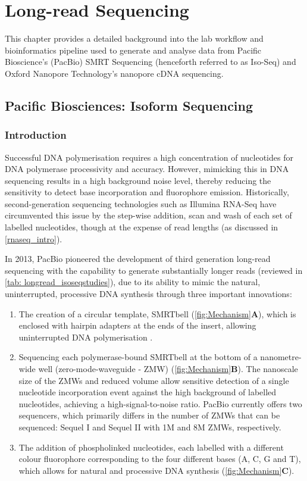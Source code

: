\chapter{Long-read Sequencing}\label{ch: long_read_sequencing}

This chapter provides a detailed background into the lab workflow and bioinformatics pipeline used to generate and analyse data from Pacific Bioscience's (PacBio) SMRT Sequencing (henceforth referred to as Iso-Seq) and Oxford Nanopore Technology's nanopore cDNA sequencing. 

\section{Pacific Biosciences: Isoform Sequencing}
\label{sec:pb_isoform_sequencing}

\subsection{Introduction}
Successful DNA polymerisation requires a high concentration of nucleotides for DNA polymerase processivity and accuracy. However, mimicking this in DNA sequencing results in a high background noise level, thereby reducing the sensitivity to detect base incorporation and fluorophore emission. Historically, second-generation sequencing technologies such as Illumina RNA-Seq have circumvented this issue by the step-wise addition, scan and wash of each set of labelled nucleotides, though at the expense of read lengths (as discussed in \cref{rnaseq_intro}). 

In 2013, PacBio pioneered the development of third generation long-read sequencing with the capability to generate substantially longer reads (reviewed in \cref{tab: longread_isoseqstudies}), due to its ability to mimic the natural, uninterrupted, processive DNA synthesis through three important innovations\cite{Eid2009}: 
\begin{enumerate}
	\item The creation of a circular template, SMRTbell (\cref{fig:Mechanism}\textbf{A}), which is enclosed with hairpin adapters at the ends of the insert, allowing uninterrupted DNA polymerisation \cite{Travers2010}.
	\item Sequencing each polymerase-bound SMRTbell at the bottom of a nanometre-wide well (zero-mode-waveguide - ZMW)\cite{Levene2003} (\cref{fig:Mechanism}\textbf{B}). The nanoscale size of the ZMWs and reduced volume allow sensitive detection of a single nucleotide incorporation event against the high background of labelled nucleotides, achieving a high-signal-to-noise ratio. PacBio currently offers two sequencers, which primarily differs in the number of ZMWs that can be sequenced: Sequel I and Sequel II with 1M and 8M ZMWs, respectively.   
	\item The addition of phospholinked nucleotides, each labelled with a different colour fluorophore corresponding to the four different bases (A, C, G and T), which allows for natural and processive DNA synthesis\cite{Mccarthy2010} (\cref{fig:Mechanism}\textbf{C}). 
\end{enumerate}

